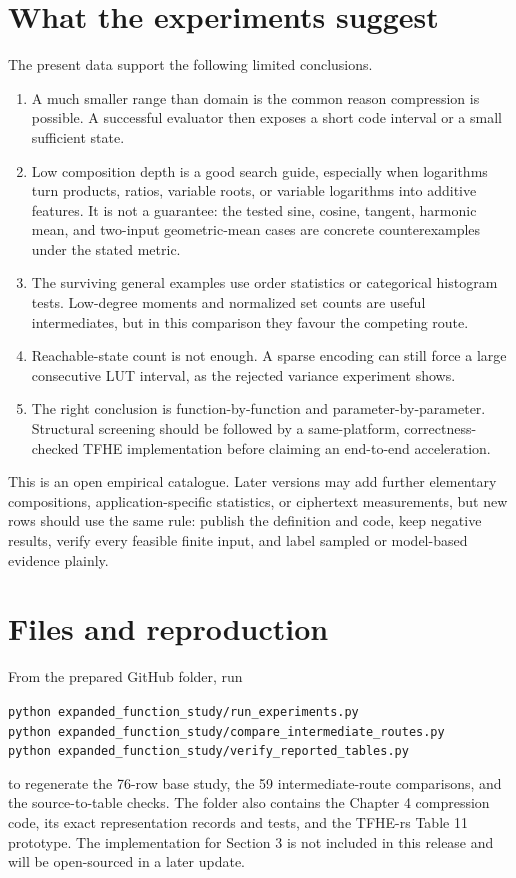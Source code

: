 \documentclass[10pt]{article}
\begin{document}
\section{What the experiments suggest}

The present data support the following limited conclusions.
\begin{enumerate}
  \item A much smaller range than domain is the common reason compression is
  possible.  A successful evaluator then exposes a short code interval or a
  small sufficient state.
  \item Low composition depth is a good search guide, especially when logarithms
  turn products, ratios, variable roots, or variable logarithms into additive
  features.  It is not a guarantee: the tested sine, cosine, tangent, harmonic
  mean, and two-input geometric-mean cases are concrete counterexamples under
  the stated metric.
  \item The surviving general examples use order statistics or categorical
  histogram tests.  Low-degree moments and normalized set counts are useful
  intermediates, but in this comparison they favour the competing route.
  \item Reachable-state count is not enough.  A sparse encoding can still force a
  large consecutive LUT interval, as the rejected variance experiment shows.
  \item The right conclusion is function-by-function and parameter-by-parameter.
  Structural screening should be followed by a same-platform, correctness-checked
  TFHE implementation before claiming an end-to-end acceleration.
\end{enumerate}

This is an open empirical catalogue.  Later versions may add further elementary
compositions, application-specific statistics, or ciphertext measurements, but
new rows should use the same rule: publish the definition and code, keep negative
results, verify every feasible finite input, and label sampled or model-based
evidence plainly.

\section{Files and reproduction}

From the prepared GitHub folder, run
\begin{center}
\texttt{python expanded\_function\_study/run\_experiments.py}\\
\texttt{python expanded\_function\_study/compare\_intermediate\_routes.py}\\
\texttt{python expanded\_function\_study/verify\_reported\_tables.py}
\end{center}
to regenerate the 76-row base study, the 59 intermediate-route comparisons,
and the source-to-table checks.  The folder also contains the Chapter 4
compression code, its exact representation records and tests, and the TFHE-rs
Table 11 prototype.  The implementation for Section 3 is not included in this
release and will be open-sourced in a later update.
\end{document}
